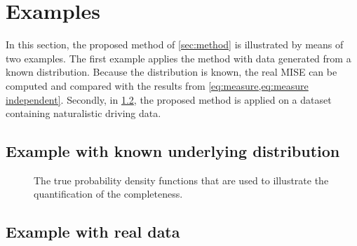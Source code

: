 \section{Examples}
\label{sec:results}

In this section, the proposed method of \cref{sec:method} is illustrated by means of two examples. The first example applies the method with data generated from a known distribution. Because the distribution is known, the real MISE can be computed and compared with the results from \cref{eq:measure,eq:measure independent}. Secondly, in \cref{sec:result real}, the proposed method is applied on a dataset containing naturalistic driving data.

\subsection{Example with known underlying distribution}
\label{sec:result artificial}

\setlength\figurewidth{\linewidth}
\setlength{}
\begin{figure}
	\centering
	
	\caption{The true probability density functions that are used to illustrate the quantification of the completeness.}
	\label{fig:true pdf}
\end{figure}


\subsection{Example with real data}
\label{sec:result real}

